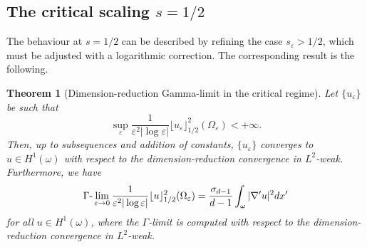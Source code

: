 \documentclass[11pt]{article}
\newtheorem{theorem}[definition]{Theorem}
\def\e{\varepsilon}
\begin{document}
\subsection{The critical scaling $s=1/2$}
The behaviour at $s=1/2$ can be described by refining the case $s_\e>1/2$, which must be adjusted with a logarithmic correction. The corresponding result is the following.

\begin{theorem}[Dimension-reduction Gamma-limit in the critical regime]\label{Gammaths1}
Let $\{u_\e\}$ be such that 
$$
\sup_{\e}\frac{1}{\e^{2}|\log\e|}\lfloor u_\e\rfloor_{1/2}^2(\Omega_\e)<+\infty.
$$
Then, up to subsequences and addition of constants, $\{u_
\e\}$ converges to $u\in H^1(\omega)$ with respect to the dimension-reduction convergence in $L^2$-weak.
Furthermore, we have
$$
\Gamma\hbox{-}\lim_{\e\to 0} \frac{1}{\e^{2}|\log\e|}\lfloor u\rfloor_{1/2}^2(\Omega_\e)= \frac{
\sigma_{d-1}
}{d-1}\int_\omega |\nabla'u|^2dx'
$$
for all $u\in H^1(\omega)$, where the $\Gamma$-limit is computed with respect to the dimension-reduction convergence in $L^2$-weak.
\end{theorem}
\end{document}
